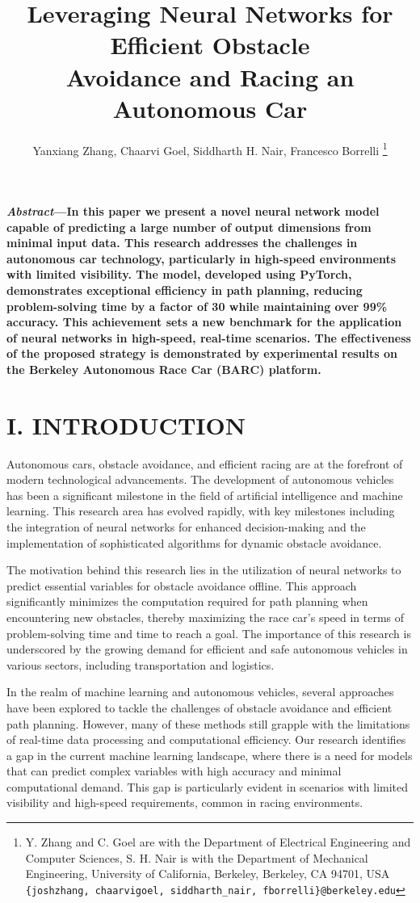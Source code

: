 \documentclass[
	letterpaper, %
	10pt, %
	unnumberedsections, %
	twoside, %
]{LTJournalArticle}
\title{Leveraging Neural Networks for Efficient Obstacle\\Avoidance and Racing an Autonomous Car}
\author{Yanxiang Zhang, Chaarvi Goel, Siddharth H. Nair, Francesco Borrelli
\thanks{\;Y. Zhang and C. Goel are with the Department of Electrical Engineering and Computer Sciences, S. H. Nair is with the Department of Mechanical Engineering, University of California, Berkeley, Berkeley, CA 94701, USA \texttt{\{joshzhang, chaarvigoel, siddharth\_nair, fborrelli\}@berkeley.edu}}}
\date{}    %
\begin{document}
\maketitle %


\textbf{\small\textit{Abstract}---In this paper we present a novel neural network model capable of predicting a large number of output dimensions from minimal input data. This research addresses the challenges in autonomous car technology, particularly in high-speed environments with limited visibility. The model, developed using PyTorch, demonstrates exceptional efficiency in path planning, reducing problem-solving time by a factor of 30 while maintaining over 99\% accuracy. This achievement sets a new benchmark for the application of neural networks in high-speed, real-time scenarios. The effectiveness of the proposed strategy is demonstrated by experimental results on the Berkeley Autonomous Race Car (BARC) platform.}

\section{I. INTRODUCTION}

Autonomous cars, obstacle avoidance, and efficient racing are at the forefront of modern technological advancements. The development of autonomous vehicles has been a significant milestone in the field of artificial intelligence and machine learning. This research area has evolved rapidly, with key milestones including the integration of neural networks for enhanced decision-making and the implementation of sophisticated algorithms for dynamic obstacle avoidance.

The motivation behind this research lies in the utilization of neural networks to predict essential variables for obstacle avoidance offline. This approach significantly minimizes the computation required for path planning when encountering new obstacles, thereby maximizing the race car's speed in terms of problem-solving time and time to reach a goal. The importance of this research is underscored by the growing demand for efficient and safe autonomous vehicles in various sectors, including transportation and logistics.

In the realm of machine learning and autonomous vehicles, several approaches have been explored to tackle the challenges of obstacle avoidance and efficient path planning. However, many of these methods still grapple with the limitations of real-time data processing and computational efficiency. Our research identifies a gap in the current machine learning landscape, where there is a need for models that can predict complex variables with high accuracy and minimal computational demand. This gap is particularly evident in scenarios with limited visibility and high-speed requirements, common in racing environments.
\end{document}
